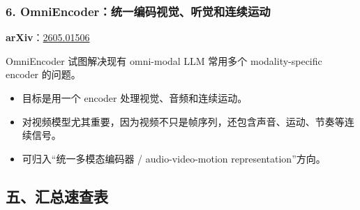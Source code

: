 \subsubsection{6. OmniEncoder：统一编码视觉、听觉和连续运动}

\textbf{arXiv}：\href{https://arxiv.org/abs/2605.01506}{2605.01506}

OmniEncoder 试图解决现有 omni-modal LLM 常用多个 modality-specific encoder 的问题。

\begin{itemize}[leftmargin=1.5em]
  \item 目标是用一个 encoder 处理视觉、音频和连续运动。
  \item 对视频模型尤其重要，因为视频不只是帧序列，还包含声音、运动、节奏等连续信号。
  \item 可归入“统一多模态编码器 / audio-video-motion representation”方向。
\end{itemize}

\subsection{五、汇总速查表}

